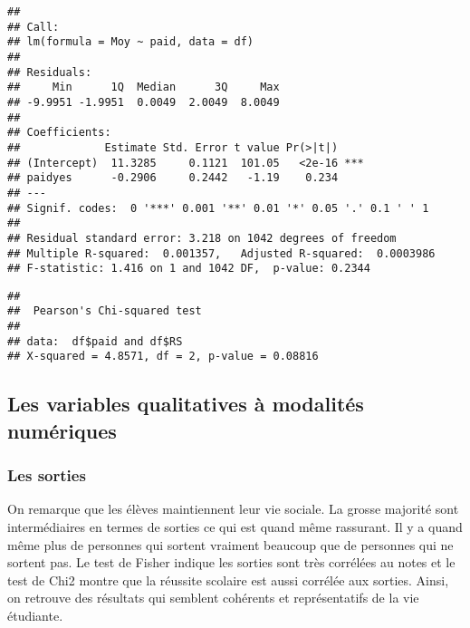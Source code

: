 \documentclass[
]{article}
\newenvironment{Shaded}{\begin{snugshade}}{\end{snugshade}}
\newcommand{\CommentTok}[1]{\textcolor[rgb]{0.56,0.35,0.01}{\textit{#1}}}
\newcommand{\FunctionTok}[1]{\textcolor[rgb]{0.00,0.00,0.00}{#1}}
\newcommand{\NormalTok}[1]{#1}
\newcommand{\SpecialCharTok}[1]{\textcolor[rgb]{0.00,0.00,0.00}{#1}}
\begin{document}
\begin{verbatim}
## 
## Call:
## lm(formula = Moy ~ paid, data = df)
## 
## Residuals:
##     Min      1Q  Median      3Q     Max 
## -9.9951 -1.9951  0.0049  2.0049  8.0049 
## 
## Coefficients:
##             Estimate Std. Error t value Pr(>|t|)    
## (Intercept)  11.3285     0.1121  101.05   <2e-16 ***
## paidyes      -0.2906     0.2442   -1.19    0.234    
## ---
## Signif. codes:  0 '***' 0.001 '**' 0.01 '*' 0.05 '.' 0.1 ' ' 1
## 
## Residual standard error: 3.218 on 1042 degrees of freedom
## Multiple R-squared:  0.001357,   Adjusted R-squared:  0.0003986 
## F-statistic: 1.416 on 1 and 1042 DF,  p-value: 0.2344
\end{verbatim}

\begin{Shaded}
\end{Shaded}

\begin{verbatim}
## 
##  Pearson's Chi-squared test
## 
## data:  df$paid and df$RS
## X-squared = 4.8571, df = 2, p-value = 0.08816
\end{verbatim}

\hypertarget{les-variables-qualitatives-uxe0-modalituxe9s-numuxe9riques}{%
\subsection{Les variables qualitatives à modalités
numériques}\label{les-variables-qualitatives-uxe0-modalituxe9s-numuxe9riques}}

\hypertarget{les-sorties}{%
\subsubsection{Les sorties}\label{les-sorties}}

On remarque que les élèves maintiennent leur vie sociale. La grosse
majorité sont intermédiaires en termes de sorties ce qui est quand même
rassurant. Il y a quand même plus de personnes qui sortent vraiment
beaucoup que de personnes qui ne sortent pas. Le test de Fisher indique
les sorties sont très corrélées au notes et le test de Chi2 montre que
la réussite scolaire est aussi corrélée aux sorties. Ainsi, on retrouve
des résultats qui semblent cohérents et représentatifs de la vie
étudiante.
\end{document}
